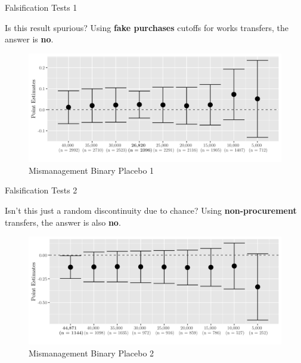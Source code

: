\documentclass[10pt,ignorenonframetext,]{beamer}
\begin{document}
\begin{frame}{Falsification Tests 1}
\protect\hypertarget{falsification-tests-1}{}

Is this result spurious? Using \textbf{fake purchases} cutoffs for works
transfers, the answer is \textbf{no}.

\begin{figure}
\centering
\includegraphics{./images/01falsificationplot1.png}
\caption{Mismanagement Binary Placebo 1}
\end{figure}

\end{frame}

\begin{frame}{Falsification Tests 2}
\protect\hypertarget{falsification-tests-2}{}

Isn't this just a random discontinuity due to chance? Using
\textbf{non-procurement} transfers, the answer is also \textbf{no}.

\begin{figure}
\centering
\includegraphics{./images/02falsificationplot1.png}
\caption{Mismanagement Binary Placebo 2}
\end{figure}

\end{frame}
\end{document}
